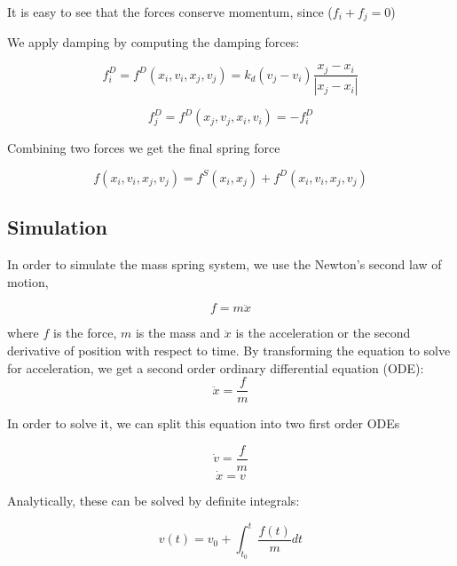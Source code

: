 \documentclass[en]{minipw} %
\begin{document}
It is easy to see that the forces conserve momentum, since ($f_i + f_j = 0$)

We apply damping by computing the damping forces:

\begin{equation}
f_{i}^{D} = f^{D}(x_i, v_i, x_j, v_j) = k_d (v_j - v_i) \dfrac{x_j - x_i}{|x_j - x_i|}
\end{equation}

\begin{equation}
f_{j}^{D} = f^{D}(x_j, v_j, x_i, v_i) = -f_{i}^{D}
\end{equation}

Combining two forces we get the final spring force

\begin{equation}
f(x_i, v_i, x_j, v_j) = f^{S}(x_i, x_j) + f^{D}(x_i, v_i, x_j, v_j)
\end{equation}

\subsection{Simulation}
In order to simulate the mass spring system, we use the Newton's second law of motion,

\begin{equation}
f = m \ddot{x}
\end{equation}

where $f$ is the force, $m$ is the mass and $\ddot{x}$ is the acceleration or the second derivative of position with respect to time. By transforming the equation to solve for acceleration, we get a second order ordinary differential equation (ODE):
\begin{equation}
\ddot{x} = \dfrac{f}{m}
\end{equation}

In order to solve it, we can split this equation into two first order ODEs

\begin{equation}
\label{eq:ode_v} 
\dot{v} = \dfrac{f}{m}
\end{equation}
\begin{equation}
\label{eq:ode_x} 
\dot{x} = v
\end{equation}

Analytically, these can be solved by definite integrals:

\begin{equation}
\label{eq:ode_anal1}
v(t) = v_0 + \int_{t_0}^{t} \dfrac{f(t)}{m} dt
\end{equation}
\end{document}
